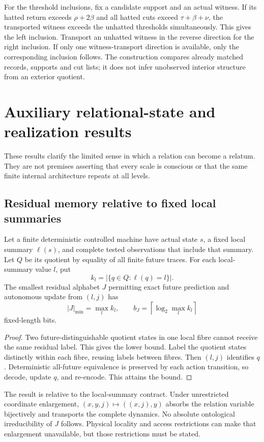 For the threshold inclusions, fix a candidate support and an actual witness. If its hatted return exceeds \(\rho+2\beta\) and all hatted cuts exceed \(\tau+\beta+\nu\), the transported witness exceeds the unhatted thresholds simultaneously. This gives the left inclusion. Transport an unhatted witness in the reverse direction for the right inclusion. If only one witness-transport direction is available, only the corresponding inclusion follows. The construction compares already matched records, supports and cut lists; it does not infer unobserved interior structure from an exterior quotient.



\section{Auxiliary relational-state and realization results}\label{app:relational}
These results clarify the limited sense in which a relation can become a relatum. They are not premises asserting that every scale is conscious or that the same finite internal architecture repeats at all levels.

\subsection{Residual memory relative to fixed local summaries}
\begin{proposition}\label{p2-32}
Let a finite deterministic controlled machine have actual state \(s\), a fixed local summary \(\ell(s)\), and complete tested observations that include that summary. Let \(Q\) be its quotient by equality of all finite future traces. For each local-summary value \(l\), put
\[
 k_l=|\{q\in Q:\ell(q)=l\}|.
\]
The smallest residual alphabet \(J\) permitting exact future prediction and autonomous update from \((l,j)\) has
\begin{equation}\label{eq:residual-memory}
 |J|_{\min}=\max_l k_l,
 \qquad b_J=\left\lceil\log_2\max_l k_l\right\rceil
\end{equation}
fixed-length bits.
\end{proposition}
\begin{proof}
Two future-distinguishable quotient states in one local fibre cannot receive the same residual label. This gives the lower bound. Label the quotient states distinctly within each fibre, reusing labels between fibres. Then \((l,j)\) identifies \(q\). Deterministic all-future equivalence is preserved by each action transition, so decode, update \(q\), and re-encode. This attains the bound.
\end{proof}
The result is relative to the local-summary contract. Under unrestricted coordinate enlargement, \((x,y,j)\mapsto((x,j),y)\) absorbs the relation variable bijectively and transports the complete dynamics. No absolute ontological irreducibility of \(J\) follows. Physical locality and access restrictions can make that enlargement unavailable, but those restrictions must be stated.

